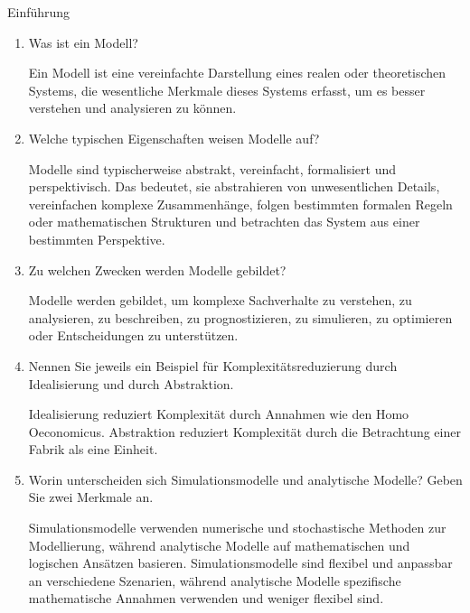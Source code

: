 \documentclass{article}
\author{Leopold Lemmermann}
\begin{document}
\createtitle

\begin{exercise}{Einführung}
  \begin{enumerate}
    \item Was ist ein Modell?
          \begin{solution}
            Ein Modell ist eine vereinfachte Darstellung eines realen oder theoretischen Systems, die wesentliche Merkmale dieses Systems erfasst, um es besser verstehen und analysieren zu können.
          \end{solution}

    \item Welche typischen Eigenschaften weisen Modelle auf?
          \begin{solution}
            Modelle sind typischerweise abstrakt, vereinfacht, formalisiert und perspektivisch. Das bedeutet, sie abstrahieren von unwesentlichen Details, vereinfachen komplexe Zusammenhänge, folgen bestimmten formalen Regeln oder mathematischen Strukturen und betrachten das System aus einer bestimmten Perspektive.
          \end{solution}

    \item Zu welchen Zwecken werden Modelle gebildet?
          \begin{solution}
            Modelle werden gebildet, um komplexe Sachverhalte zu verstehen, zu analysieren, zu beschreiben, zu prognostizieren, zu simulieren, zu optimieren oder Entscheidungen zu unterstützen.
          \end{solution}

    \item Nennen Sie jeweils ein Beispiel für Komplexitätsreduzierung durch Idealisierung und durch Abstraktion.
          \begin{solution}
            Idealisierung reduziert Komplexität durch Annahmen wie den Homo Oeconomicus. Abstraktion reduziert Komplexität durch die Betrachtung einer Fabrik als eine Einheit.
          \end{solution}

    \item Worin unterscheiden sich Simulationsmodelle und analytische Modelle? Geben Sie zwei Merkmale an.
          \begin{solution}
            Simulationsmodelle verwenden numerische und stochastische Methoden zur Modellierung, während analytische Modelle auf mathematischen und logischen Ansätzen basieren. Simulationsmodelle sind flexibel und anpassbar an verschiedene Szenarien, während analytische Modelle spezifische mathematische Annahmen verwenden und weniger flexibel sind.
          \end{solution}


\end{enumerate}
\end{exercise}
\end{document}

